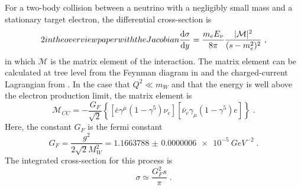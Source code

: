 For a two-body collision between a neutrino with a negligibly small mass and a stationary target electron, the differential cross-section is
\begin{equation}
2 in the overview paper with the Jacobian
    \frac{\mathrm{d} \sigma}{\mathrm{d} y} = \frac{m_e E_\nu}{8\pi}\frac{|\mathcal{M}|^2}{(s-m_e^2)^2}\;,
\end{equation}
in which $\mathcal{M}$ is the matrix element of the interaction.
The matrix element can be calculated at tree level from the Feynman diagram in  and the charged-current Lagrangian from .
In the case that $Q^2 \ll m_W$ and that the energy is well above the electron production limit, the matrix element is
\begin{equation}
    \mathcal{M}_{CC} = -\frac{G_F}{\sqrt{2}}\left\{ [\bar{e}\gamma^\mu(1-\gamma^5)\nu_e][\bar{\nu}_e\gamma_\mu(1-\gamma^5)e] \right\}\;.
\end{equation}
Here, the constant $G_F$ is the fermi constant\cite{pdg}
\begin{equation}
    G_F = \frac{g^2}{2\sqrt{2}M_W^2} = \SI{1.1663788(6)e-5}{GeV^{-2}}\;.
\end{equation}
The integrated cross-section for this process is
\begin{equation}
    \sigma \simeq \frac{G^2_F s}{\pi}\;.
\end{equation}

